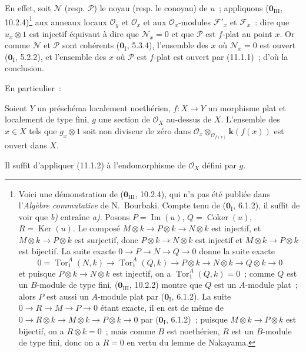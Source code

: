 En effet, soit $\mathcal N$ (resp. $\mathcal P$) le noyau (resp. le conoyau) de
$u$~; appliquons ($\mathbf 0_{\mathrm{III}}$, 10.2.4)\footnote{Voici une
démonstration de ($\mathbf 0_{\mathrm{III}}$, 10.2.4), qui n'a pas été publiée
dans l'\emph{Algèbre commutative} de N.~Bourbaki. Compte tenu de
($\mathbf 0_{\mathrm I}$, 6.1.2), il suffit de voir que \emph{b)} entraîne \emph{a)}. Posons
$P=\operatorname{Im}(u)$, $Q=\operatorname{Coker}(u)$,
$R=\operatorname{Ker}(u)$. Le composé
$M\otimes k\to P\otimes k\to N\otimes k$ est injectif, et
$M\otimes k\to P\otimes k$ est surjectif, donc
$P\otimes k\to N\otimes k$ est injectif et
$M\otimes k\to P\otimes k$ est bijectif. La suite exacte
$0\to P\to N\to Q\to0$ donne la suite exacte
\[
0=\operatorname{Tor}_1^A(N,k)\to\operatorname{Tor}_1^A(Q,k)
\to P\otimes k\to N\otimes k\to Q\otimes k\to0
\]
et puisque $P\otimes k\to N\otimes k$ est injectif, on a
$\operatorname{Tor}_1^A(Q,k)=0$~; comme $Q$ est un $B$-module de type fini,
($\mathbf 0_{\mathrm{III}}$, 10.2.2) montre que $Q$ est un $A$-module plat~;
alors $P$ est aussi un $A$-module plat par ($\mathbf 0_{\mathrm I}$, 6.1.2).
La suite $0\to R\to M\to P\to0$ étant exacte, il en est de même de
$0\to R\otimes k\to M\otimes k\to P\otimes k\to0$ par
($\mathbf 0_{\mathrm I}$, 6.1.2)~; puisque $M\otimes k\to P\otimes k$ est
bijectif, on a $R\otimes k=0$~; mais comme $B$ est noethérien, $R$ est un
$B$-module de type fini, donc on a $R=0$ en vertu du lemme de Nakayama.} aux
anneaux locaux $\mathcal O_y$ et $\mathcal O_x$ et aux
$\mathcal O_x$-modules $\mathcal F'_x$ et $\mathcal F_x$~: dire que
$u_x\otimes1$ est injectif équivaut à dire que $\mathcal N_x=0$ et que
$\mathcal P$ est $f$-plat au point $x$. Or comme $\mathcal N$ et $\mathcal P$
sont cohérents ($\mathbf 0_{\mathrm I}$, 5.3.4), l'ensemble des $x$ où
$\mathcal N_x=0$ est ouvert ($\mathbf 0_{\mathrm I}$, 5.2.2), et l'ensemble
des $x$ où $\mathcal P$ est $f$-plat est ouvert par (11.1.1)~; d'où la
conclusion.

En particulier~:

\begin{corollary}[11.1.3]
\label{IV.11.1.3-fr}
Soient $Y$ un préschéma localement noethérien, $f:X\to Y$ un morphisme plat et
localement de type fini, $g$ une section de $\mathcal O_X$ au-dessus de $X$.
L'ensemble des $x\in X$ tels que $g_x\otimes1$ soit non diviseur de zéro dans
$\mathcal O_x\otimes_{\mathcal O_{f(x)}}\boldsymbol{k}(f(x))$ est ouvert dans $X$.
\end{corollary}

Il suffit d'appliquer (11.1.2) à l'endomorphisme de $\mathcal O_X$ défini par
$g$.

